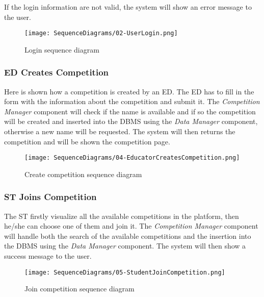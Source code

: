 If the login information are not valid, the system will show an error message to the user.

\begin{figure}[H]
  \centering
  \texttt{[image: SequenceDiagrams/02-UserLogin.png]}
  \caption{Login sequence diagram}
  \label{fig:login_diagramn}
\end{figure}

\subsubsection*{ED Creates Competition}
\label{ss:create_competition_diagram}
Here is shown how a competition is created by an ED. The ED has to fill in the form with the information about the competition and submit it. The \textit{Competition Manager} component will check if the name is available and if so the competition will be created and inserted into the DBMS using the \textit{Data Manager} component, otherwise a new name will be requested. The system will then returns the competition and will be shown the competition page.

\begin{figure}[H]
  \centering
  \texttt{[image: SequenceDiagrams/04-EducatorCreatesCompetition.png]}
  \caption{Create competition sequence diagram}
  \label{fig:create_competition_diagramn}
\end{figure}

\subsubsection*{ST Joins Competition}
\label{ss:join_competition_diagram}
The ST firstly visualize all the available competitions in the platform, then he/she can choose one of them and join it. The \textit{Competition Manager} component will handle both the search of the available competitions and the insertion into the DBMS using the \textit{Data Manager} component. The system will then show a success message to the user.

\begin{figure}[H]
  \centering
  \texttt{[image: SequenceDiagrams/05-StudentJoinCompetition.png]}
  \caption{Join competition sequence diagram}
  \label{fig:join_competition_diagramn}
\end{figure}

